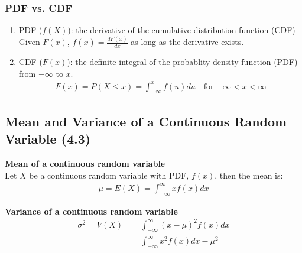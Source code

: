 \documentclass[../INDE315.tex]{subfiles}
\begin{document}
\subsubsection*{PDF vs. CDF}
\begin{enumerate}
    \item PDF ($f(X)$): the derivative of the cumulative distribution function (CDF) \\
        Given $F(x)$, $f(x) = \frac{dF(x)}{dx}$ as long as the derivative exists.
    \item CDF ($F(x)$): the definite integral of the probablity density function (PDF) from $-\infty$ to $x$. 
    \begin{equation*}
        \begin{aligned}
            F(x) = P(X \leq x) = \int ^{x}_{-\infty} f(u) du \quad \text{for $-\infty < x < \infty$}
        \end{aligned}
    \end{equation*}
\end{enumerate}

\subsection*{Mean and Variance of a Continuous Random Variable (4.3)}
\begin{defn}
    \textbf{Mean of a continuous random variable} \\
    Let $X$ be a continuous random variable with PDF, $f(x)$, then the mean is:
    \begin{equation*}
        \begin{aligned}
            \mu = E(X) = \int ^{\infty}_{-\infty} x f(x) dx
        \end{aligned}
    \end{equation*}  
\end{defn}

\begin{defn}
    \textbf{Variance of a continuous random variable} \\
    \begin{equation*}
        \begin{aligned}
            \sigma ^2 = V(X) &= \int ^{\infty}_{-\infty} (x - \mu)^2 f(x) dx  \\
                        &= \int ^{\infty}_{-\infty} x^2 f(x) dx - \mu ^2 
        \end{aligned}
    \end{equation*}
\end{defn}
\end{document}
